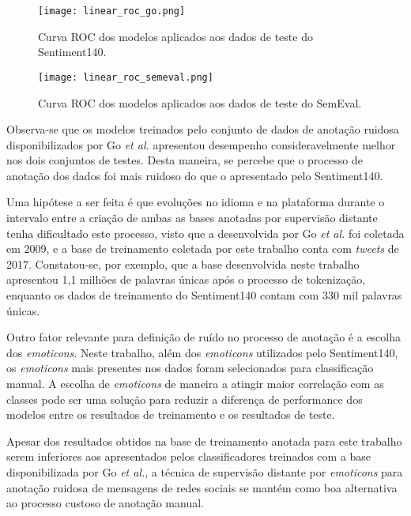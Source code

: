 \begin{figure}
\begin{center} {
    \begin{center}
    \texttt{[image: linear\_roc\_go.png]}
    \caption{Curva ROC dos modelos aplicados aos dados de teste do Sentiment140.}
    \label{fig:linear_roc_go}
    \end{center}
}
\end{center}
\end{figure}

\begin{figure}
\begin{center} {
    \begin{center}
    \texttt{[image: linear\_roc\_semeval.png]}
    \caption{Curva ROC dos modelos aplicados aos dados de teste do SemEval.}
    \label{fig:linear_roc_semeval}
    \end{center}
}
\end{center}
\end{figure}

Observa-se que os modelos treinados pelo conjunto de dados de anotação ruidosa disponibilizados por Go
\textit{et al.} apresentou desempenho consideravelmente melhor nos dois conjuntos de testes.
Desta maneira, se percebe que o processo de anotação dos dados foi mais ruidoso do que o apresentado pelo Sentiment140.

Uma hipótese a ser feita é que evoluções no idioma e na plataforma durante o intervalo entre a criação de ambas as
bases anotadas por supervisão distante tenha dificultado este processo, visto que a desenvolvida por Go \textit{et al.}
foi coletada em 2009, e a base de treinamento coletada por este trabalho conta com \textit{tweets} de 2017.
Constatou-se, por exemplo, que a base desenvolvida neste trabalho apresentou 1,1 milhões de palavras únicas após o
processo de tokenização, enquanto os dados de treinamento do Sentiment140 contam com 330 mil palavras únicas.

Outro fator relevante para definição de ruído no processo de anotação é a escolha dos \textit{emoticons}.
Neste trabalho, além dos \textit{emoticons} utilizados pelo Sentiment140, os \textit{emoticons} mais presentes nos dados
foram selecionados para classificação manual.
A escolha de \textit{emoticons} de maneira a atingir maior correlação com as classes pode ser uma solução para reduzir
a diferença de performance dos modelos entre os resultados de treinamento e os resultados de teste.

Apesar dos resultados obtidos na base de treinamento anotada para este trabalho serem inferiores aos apresentados pelos
classificadores treinados com a base disponibilizada por Go \textit{et al.}, a técnica de supervisão distante por
\textit{emoticons} para anotação ruidosa de mensagens de redes sociais se mantém como boa alternativa ao processo
custoso de anotação manual.

